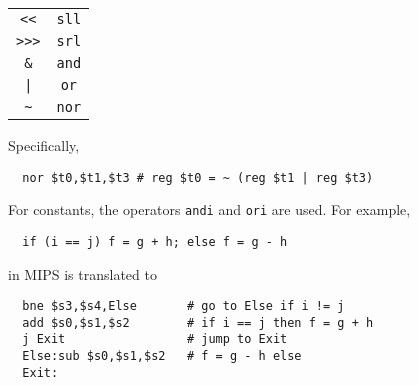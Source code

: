 \documentclass{tufte-book}
\begin{document}
\begin{marginfigure}
\begin{adjustbox}{width=0.45\columnwidth}{%
  \begin{tabular}{cc}
    \verb|<<| & \verb|sll| \\
    \verb|>>>| & \verb|srl| \\
    \verb|&| & \verb|and| \\
    \verb+|+ & \verb|or| \\
    \verb|~| & \verb|nor|
  \end{tabular}}
\end{adjustbox}
\end{marginfigure}


Specifically,
\begin{lstlisting}
  nor $t0,$t1,$t3 # reg $t0 = ~ (reg $t1 | reg $t3)
\end{lstlisting}
For constants, the operators \verb|andi| and \verb|ori| are used. For example,
\begin{verbatim}
  if (i == j) f = g + h; else f = g - h
\end{verbatim}
in MIPS is translated to
\begin{lstlisting}
  bne $s3,$s4,Else       # go to Else if i != j
  add $s0,$s1,$s2        # if i == j then f = g + h
  j Exit                 # jump to Exit
  Else:sub $s0,$s1,$s2   # f = g - h else
  Exit:
\end{lstlisting}
\end{document}
